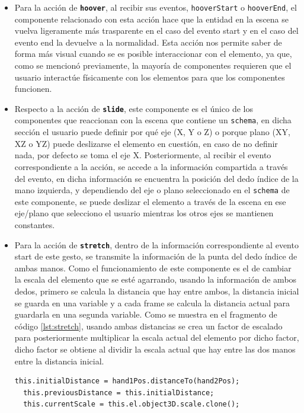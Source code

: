 \documentclass[a4paper, 12pt]{book}
\begin{document}
\begin{itemize}
  \item Para la acción de \textbf{\texttt{hoover}}, al recibir sus eventos, \texttt{hooverStart} o \texttt{hooverEnd}, el componente relacionado con esta acción hace que la entidad en la escena se vuelva ligeramente más trasparente en el caso del evento start y en el caso del evento end la devuelve a la normalidad. Esta acción nos permite saber de forma más visual cuando se es posible interaccionar con el elemento, ya que, como se mencionó previamente, la mayoría de componentes requieren que el usuario interactúe físicamente con los elementos para que los componentes funcionen.

  \item Respecto a la acción de \textbf{\texttt{slide}}, este componente es el único de los componentes que reaccionan con la escena que contiene un \texttt{schema}, en dicha sección el usuario puede definir por qué eje (X, Y o Z) o porque plano (XY, XZ o YZ) puede deslizarse el elemento en cuestión, en caso de no definir nada, por defecto se toma el eje X. Posteriormente, al recibir el evento correspondiente a la acción, se accede a la información compartida a través del evento, en dicha información se encuentra la posición del dedo índice de la mano izquierda, y dependiendo del eje o plano seleccionado en el \texttt{schema} de este componente, se puede deslizar el elemento a través de la escena en ese eje/plano que selecciono el usuario mientras los otros ejes se mantienen constantes.

  \item Para la acción de \textbf{\texttt{stretch}}, dentro de la información correspondiente al evento start de este gesto, se transmite la información de la punta del dedo índice de ambas manos. Como el funcionamiento de este componente es el de cambiar la escala del elemento que se esté agarrando, usando la información de ambos dedos, primero se calcula la distancia que hay entre ambos, la distancia inicial se guarda en una variable y a cada frame se calcula la distancia actual para guardarla en una segunda variable. Como se muestra en el fragmento de código \ref{lst:stretch}, usando ambas distancias se crea un factor de escalado para posteriormente multiplicar la escala actual del elemento por dicho factor, dicho factor se obtiene al dividir la escala actual que hay entre las dos manos entre la distancia inicial.
  \begin{lstlisting}[caption=Actualización del factor de escala, captionpos=b, label=lst:stretch]
  this.initialDistance = hand1Pos.distanceTo(hand2Pos);
  this.previousDistance = this.initialDistance;
  this.currentScale = this.el.object3D.scale.clone();


\end{lstlisting}
\end{itemize}
\end{document}
